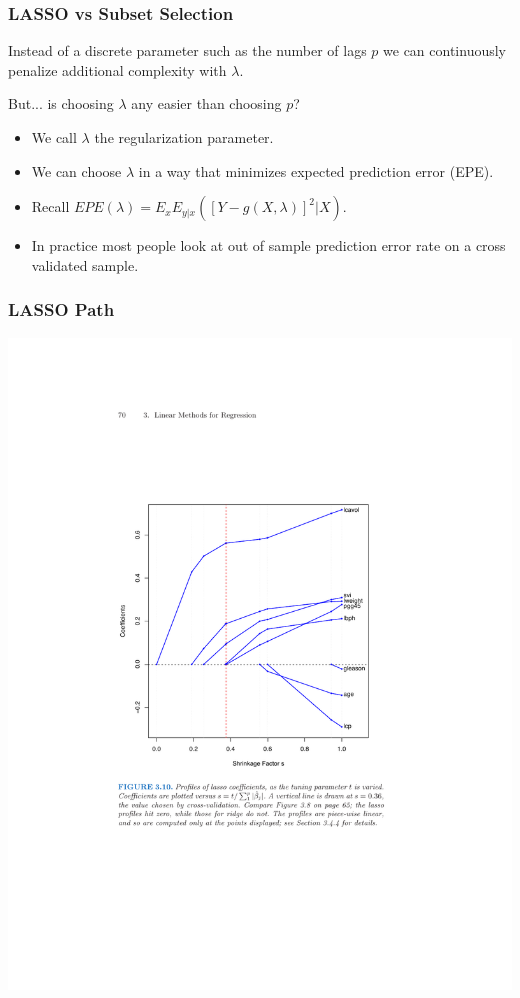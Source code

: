 \begin{frame}
\frametitle{LASSO vs Subset Selection}

Instead of a discrete parameter such as the number of lags $p$ we can continuously penalize additional complexity with $\lambda$. 

But... is choosing $\lambda$ any easier than choosing $p$?
\begin{itemize}
\item We call $\lambda$ the \alert{regularization} parameter.
\item We can choose $\lambda$ in a way that minimizes expected prediction error (EPE).
\item Recall $EPE(\lambda) = E_x E_{y|x} ([ Y- g(X,\lambda)]^2 | X)$.
\item In practice most people look at out of sample prediction error rate on a \alert{cross validated sample}.
\end{itemize}
\end{frame}

\begin{frame}
\frametitle{LASSO Path}
\vspace{-25pt}
\begin{center}
\includegraphics[height=0.85\textheight]{./resources/lassopath}
\end{center}
\end{frame}

